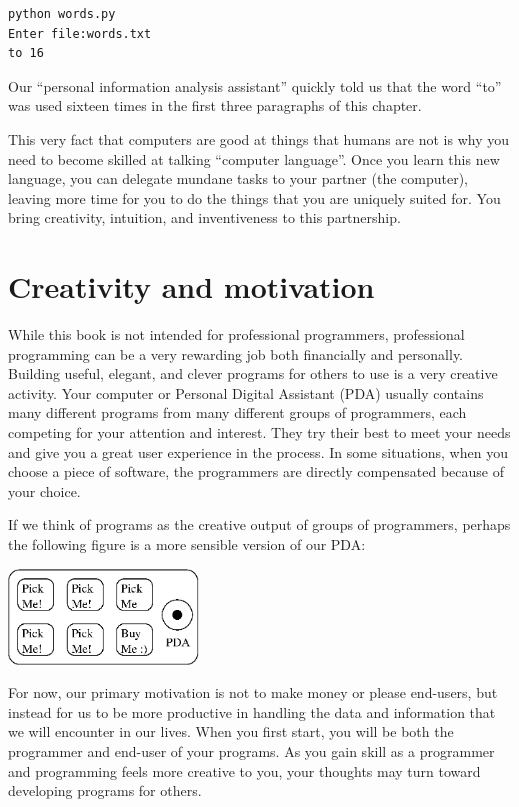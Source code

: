 \beforeverb
\begin{verbatim}
python words.py
Enter file:words.txt
to 16
\end{verbatim}
\afterverb
%
Our ``personal information analysis assistant'' quickly 
told us that the word ``to'' was used sixteen times in the
first three paragraphs of this chapter.

This very fact that computers are good at things 
that humans are not is why you need to become
skilled at talking ``computer language''.  Once you learn
this new language, you can delegate mundane tasks
to your partner (the computer), leaving more time 
for you to do the 
things that you are uniquely suited for.  You bring 
creativity, intuition, and inventiveness to this
partnership.  

\section{Creativity and motivation}

While this book is not intended for professional programmers, professional
programming can be a very rewarding job both financially and personally.
Building useful, elegant, and clever programs for others to use is a very
creative activity.  Your computer or Personal Digital Assistant (PDA) 
usually contains many different programs from many different groups of 
programmers, each competing for your attention and interest.  They try 
their best to meet your needs and give you a great user experience in the
process.   In some situations, when you choose a piece of software, the 
programmers are directly compensated because of your choice.

If we think of programs as the creative output of groups of programmers,
perhaps the following figure is a more sensible version of our PDA:

\beforefig
\centerline{\includegraphics[height=1.00in]{figs2/pda2.eps}}
\afterfig

For now, our primary motivation is not to make money or please end-users, but
instead for us to be more productive in handling the data and 
information that we will encounter in our lives.
When you first start, you will be both the programmer and end-user of
your programs.  As you gain skill as a programmer and
programming feels more creative to you, your thoughts may turn
toward developing programs for others.

